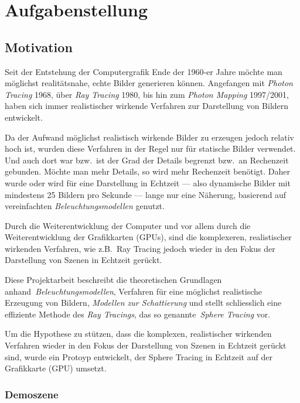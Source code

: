 
\chapter{Aufgabenstellung}
\label{chap:scope}

\section{Motivation}
\label{sec:motivation}

Seit der Entstehung der Computergrafik Ende der 1960-er Jahre möchte man
möglichst realitätsnahe, echte Bilder generieren können. Angefangen mit
\textit{Photon Tracing} 1968, über \textit{Ray Tracing} 1980, bis hin
zum \textit{Photon Mapping} 1997/2001, haben sich immer realistischer
wirkende Verfahren zur Darstellung von Bildern entwickelt.

Da der Aufwand möglichst realistisch wirkende Bilder zu erzeugen jedoch
relativ hoch ist, wurden diese Verfahren in der Regel nur für statische
Bilder verwendet. Und auch dort war bzw.\ ist der Grad der Details
begrenzt bzw.\ an Rechenzeit gebunden. Möchte man mehr Details, so wird
mehr Rechenzeit benötigt. Daher wurde oder wird für eine Darstellung in
Echtzeit --- also dynamische Bilder mit mindestens 25 Bildern pro
Sekunde --- lange nur eine Näherung, basierend auf vereinfachten
\textit{Beleuchtungsmodellen} genutzt.

Durch die Weiterentwicklung der Computer und vor allem durch die
Weiterentwicklung der Grafikkarten (GPUs), sind die komplexeren,
realistischer wirkenden Verfahren, wie z.B.\ Ray Tracing jedoch
wieder in den Fokus der Darstellung von Szenen in Echtzeit gerückt.

Diese Projektarbeit beschreibt die theoretischen Grundlagen
anhand~\textit{Beleuchtungsmodellen}, Verfahren für eine möglichst
realistische Erzeugung von Bildern, \textit{Modellen zur Schattierung}
und stellt schliesslich eine effiziente Methode des \textit{Ray
    Tracings}, das so genannte~\textit{Sphere Tracing} vor.

Um die Hypothese zu stützen, dass die komplexen, realistischer wirkenden
Verfahren wieder in den Fokus der Darstellung von Szenen in Echtzeit
gerückt sind, wurde ein Protoyp entwickelt, der Sphere Tracing in
Echtzeit auf der Grafikkarte (GPU) umsetzt.

\subsection{Demoszene}
\label{subsec:demoscene}

